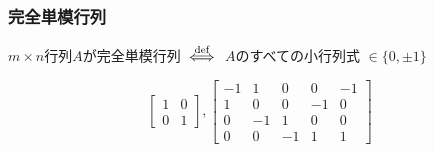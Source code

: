 \documentclass[14pt,aspectratio=169,xcolor=dvipsnames,table,onlytextwidth,dvipdfmx]{beamer}
\begin{document}
\begin{frame}
    \frametitle{完全単模行列}
    \begin{definition}[完全単模行列]
        $m \times n$行列$A$が\alert{完全単模行列}
        $\overset{\text{def}}{\iff}$ $A$のすべての小行列式 $\in \{0, \pm 1\}$
    \end{definition}

    \begin{example}
        \[
            \begin{bmatrix}
                1 & 0 \\
                0 & 1
            \end{bmatrix},
            \begin{bmatrix}
                -1 &  1 &  0 & 0  & -1 \\
                1  &  0 &  0 & -1 & 0  \\
                0  & -1 &  1 & 0  & 0  \\
                0  &  0 & -1 & 1  & 1  
            \end{bmatrix} 
        \]
    \end{example}
\end{frame}
\end{document}
